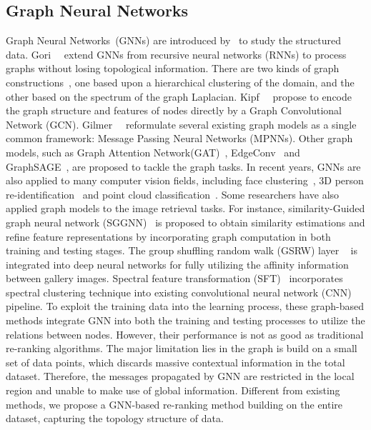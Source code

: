 \documentclass[10pt,twocolumn,letterpaper]{article}
\begin{document}
\subsection{Graph Neural Networks} 
Graph Neural Networks~(GNNs) are introduced by~\cite{gori2005new} to study the structured data. Gori~\etal~\cite{gori2005new} extend GNNs from recursive neural networks (RNNs) to process graphs without losing topological information. 
There are two kinds of graph constructions~\cite{bruna2013spectral}, one based upon a hierarchical clustering of the domain, and the other based on the spectrum of the graph Laplacian.
Kipf~\etal~\cite{kipf2016semi} propose to encode the graph structure and features of nodes directly by a Graph Convolutional Network (GCN). Gilmer~\etal~\cite{gilmer2017neural} reformulate several existing graph models as a single common framework: Message Passing Neural Networks (MPNNs). Other graph models, such as  Graph Attention Network(GAT)~\cite{velivckovic2017graph}, EdgeConv~\cite{wang2019dynamic} and GraphSAGE~\cite{hamilton2017inductive}, are proposed to tackle the graph tasks.
In recent years, GNNs are also applied to many computer vision fields, including face clustering~\cite{wang2019linkage}, 3D person re-identification~\cite{zheng2020person} and point cloud classification~\cite{wang2019dynamic}. Some researchers have also applied graph models to the image retrieval tasks. For instance, similarity-Guided graph neural network (SGGNN)~\cite{shen2018person} is proposed to obtain similarity estimations and refine feature representations by incorporating graph computation in both training and testing stages. The group shuffling random walk (GSRW) layer ~\cite{shen2018deep} is integrated into deep neural networks for fully utilizing the affinity information between gallery images. Spectral feature transformation (SFT)~\cite{luo2019spectral}  incorporates spectral clustering technique into existing convolutional neural network (CNN) pipeline. To exploit the training data into the learning process, these graph-based methods integrate GNN into both the training and testing processes to utilize the relations between nodes. However, their performance is not as good as traditional re-ranking algorithms. The major limitation lies in the graph is build on a small set of data points, which discards massive contextual information in the total dataset. Therefore, the messages propagated by GNN are restricted in the local region and unable to make use of global information. Different from existing methods, we propose a GNN-based re-ranking method building on the entire dataset, capturing the topology structure of data.
\end{document}
